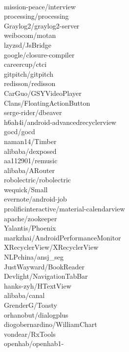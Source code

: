 \documentclass[twoside]{praca}
\begin{document}
\begin{multicols}{3}
\\mission-peace/interview\\processing/processing\\Graylog2/graylog2-server\\weibocom/motan\\lzyzsd/JsBridge\\google/closure-compiler\\careercup/ctci\\gitpitch/gitpitch\\redisson/redisson\\CarGuo/GSYVideoPlayer\\Clans/Floating\-Action\-Button\\serge-rider/dbeaver\\h6ah4i/android-advanced\-recycler\-view\\gocd/gocd\\naman14/Timber\\alibaba/dexposed\\aa112901/remusic\\alibaba/ARouter\\robolectric/robolectric\\wequick/Small\\evernote/android-job\\prolificinteractive/material-calendarview\\apache/zookeeper\\Yalantis/Phoenix\\markzhai/Android\-Performance\-Monitor\\X\-Recycler\-View/X\-Recycler\-View\\NLPchina/ansj\_seg\\JustWayward/BookReader\\Devlight/NavigationTabBar\\hanks-zyh/HTextView\\alibaba/canal\\GrenderG/Toasty\\orhanobut/dialogplus\\diogobernardino/William\-Chart\\vondear/RxTools\\openhab/openhab1-
\end{multicols}
\end{document}
